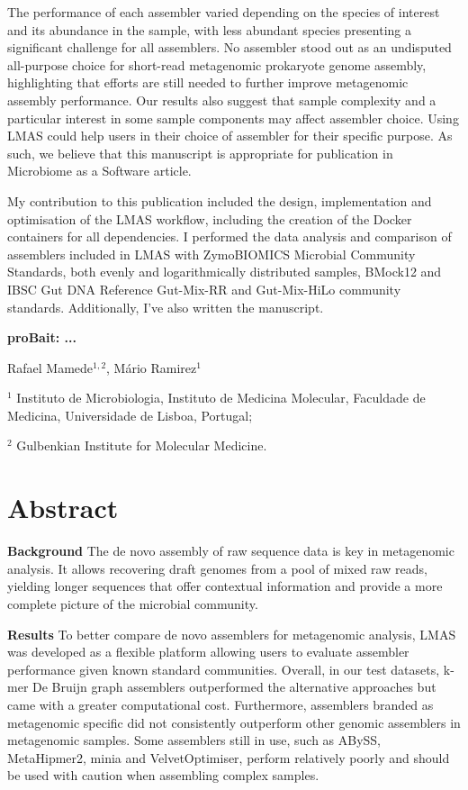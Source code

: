 The performance of each assembler varied depending on the species of interest and its abundance in the sample, with less abundant species presenting a significant challenge for all assemblers. No assembler stood out as an undisputed all-purpose choice for short-read metagenomic prokaryote genome assembly, highlighting that efforts are still needed to further improve metagenomic assembly performance. Our results also suggest that sample complexity and a particular interest in some sample components may affect assembler choice. Using LMAS could help users in their choice of assembler for their specific purpose.  As such, we believe that this manuscript is appropriate for publication in Microbiome as a Software article. 

My contribution to this publication included the design, implementation and optimisation of the LMAS workflow, including the creation of the Docker containers for all dependencies. I performed the data analysis and comparison of assemblers included in LMAS with ZymoBIOMICS Microbial Community Standards, both evenly and logarithmically distributed samples, BMock12 and IBSC Gut DNA Reference Gut-Mix-RR and Gut-Mix-HiLo community standards. Additionally, I've also written the manuscript.

\cleardoublepage 

\begin{center}
\large
\textbf{proBait: ...}
\end{center}

Rafael Mamede$^{1,2}$,
Mário Ramirez$^{1}$

$^1$ Instituto de Microbiologia, Instituto de Medicina Molecular, Faculdade de Medicina, Universidade de Lisboa, Portugal;

$^2$ Gulbenkian Institute for Molecular Medicine.

\section{Abstract}

\textbf{Background }The de novo assembly of raw sequence data is key in metagenomic analysis. It allows recovering draft genomes from a pool of mixed raw reads, yielding longer sequences that offer contextual information and provide a more complete picture of the microbial community.

\textbf{Results} To better compare de novo assemblers for metagenomic analysis, LMAS was developed as a flexible platform allowing users to evaluate assembler performance given known standard communities. Overall, in our test datasets, k-mer De Bruijn graph assemblers outperformed the alternative approaches but came with a greater computational cost. Furthermore, assemblers branded as metagenomic specific did not consistently outperform other genomic assemblers in metagenomic samples. Some assemblers still in use, such as ABySS, MetaHipmer2, minia and VelvetOptimiser, perform relatively poorly and should be used with caution when assembling complex samples. 

